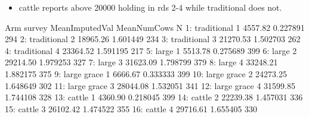 
\begin{itemize}
\vspace{1.0ex}\setlength{\itemsep}{1.0ex}\setlength{\baselineskip}{12pt}
\item	\textsf{cattle} reports above 20000 holding in rds 2-4 while \textsf{traditional} does not.
\end{itemize}
\begin{Schunk}
\begin{Soutput}
            Arm survey MeanImputedVal MeanNumCows   N
 1: traditional      1        4557.82    0.227891 294
 2: traditional      2       18965.26    1.601449 234
 3: traditional      3       21270.53    1.502703 262
 4: traditional      4       23364.52    1.591195 217
 5:       large      1        5513.78    0.275689 399
 6:       large      2       29214.50    1.979253 327
 7:       large      3       31623.09    1.798799 379
 8:       large      4       33248.21    1.882175 375
 9: large grace      1        6666.67    0.333333 399
10: large grace      2       24273.25    1.648649 302
11: large grace      3       28044.08    1.532051 341
12: large grace      4       31599.85    1.744108 328
13:      cattle      1        4360.90    0.218045 399
14:      cattle      2       22239.38    1.457031 336
15:      cattle      3       26102.42    1.474522 355
16:      cattle      4       29716.61    1.655405 330
\end{Soutput}
\end{Schunk}




